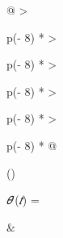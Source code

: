 \documentclass[
]{article}
\begin{document}
\begin{longtable}[]{@{}
  >{\raggedright\arraybackslash}p{(\columnwidth - 8\tabcolsep) * }
  >{\raggedright\arraybackslash}p{(\columnwidth - 8\tabcolsep) * }
  >{\raggedright\arraybackslash}p{(\columnwidth - 8\tabcolsep) * }
  >{\raggedright\arraybackslash}p{(\columnwidth - 8\tabcolsep) * }
  >{\raggedright\arraybackslash}p{(\columnwidth - 8\tabcolsep) * }@{}}
\toprule()
\begin{minipage}[b]{\linewidth}\raggedright
\emph{𝜃}′(\emph{𝑡}) =
\end{minipage} &
\end{longtable}
\end{document}

